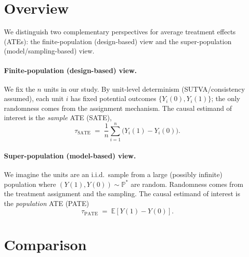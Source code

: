 \documentclass[11pt]{exam}
\theoremstyle{plain}
\newcommand{\E}{\mathbb{E}}
\begin{document}

\begingroup\small

\section{Overview}
We distinguish two complementary perspectives for average treatment effects (ATEs): the finite-population (design-based) view and the super-population (model/sampling-based) view.

\paragraph{Finite-population (design-based) view.}
We fix the $n$ units in our study. By unit-level determinism (SUTVA/consistency assumed), each unit $i$ has fixed potential outcomes $\{Y_i(0),Y_i(1)\}$; the only randomness comes from the assignment mechanism. The causal estimand of interest is the \emph{sample} ATE (SATE),
\[
\tau_{\text{SATE}} \;=\; \frac{1}{n}\sum_{i=1}^n\bigl(Y_i(1)-Y_i(0)\bigr).
\]

\paragraph{Super-population (model-based) view.}
We imagine the units are an i.i.d.\ sample from a large (possibly infinite) population where $(Y(1),Y(0)) \sim \mathbb{P}^\ast$ are random. Randomness comes from the treatment assignment and the sampling. The causal estimand of interest is the \emph{population} ATE (PATE)
\[
\tau_{\text{PATE}} \;=\; \E\!\left[Y(1)-Y(0)\right].
\]

\section{Comparison}
\end{document}
